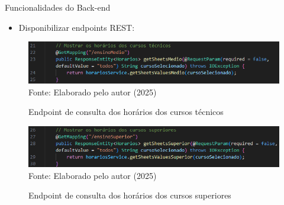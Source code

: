 \begin{frame}{Funcionalidades do Back-end}
    \begin{itemize}
        \item Disponibilizar endpoints REST:
    \end{itemize}
    \begin{figure}
        \centering
        \vspace{-0.3cm}
        \caption{Endpoint de consulta dos horários dos cursos técnicos}
        \vspace{-0.2cm}
        \includegraphics[width=1\textwidth]{figuras/back-3.png}
        \\ %
        \footnotesize Fonte: Elaborado pelo autor (2025)
    \end{figure}
    \begin{figure}
        \centering
        \vspace{-0.5cm}
        \caption{Endpoint de consulta dos horários dos cursos superiores}
        \vspace{-0.2cm}
        \includegraphics[width=1\textwidth]{figuras/back-4.png}
        \\ %
        \footnotesize Fonte: Elaborado pelo autor (2025)
    \end{figure}
\end{frame}

